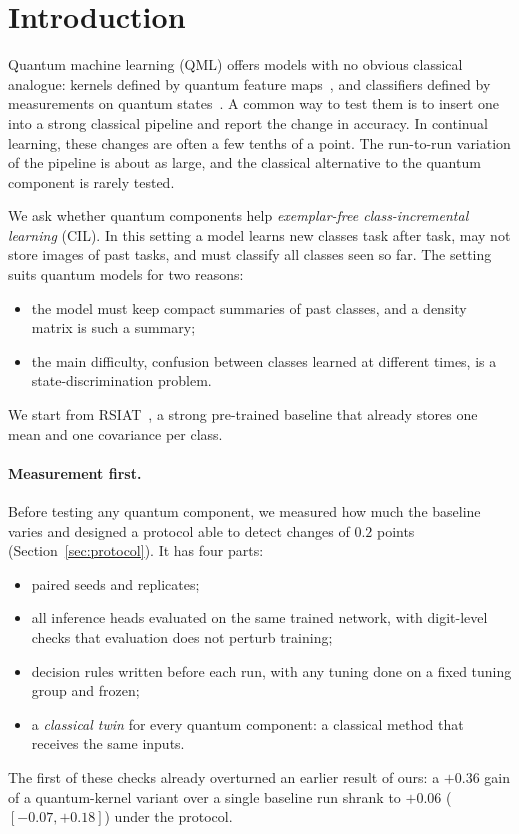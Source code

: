 \section{Introduction}
\label{sec:intro}

Quantum machine learning (QML) offers models with no obvious classical
analogue: kernels defined by quantum feature maps~\cite{huang2021power}, and
classifiers defined by measurements on quantum states~\cite{hausladen1994pgm}.
A common way to test them is to insert one into a strong classical pipeline
and report the change in accuracy. In continual learning, these changes are
often a few tenths of a point. The run-to-run variation of the pipeline is
about as large, and the classical alternative to the quantum component is
rarely tested.

We ask whether quantum components help \emph{exemplar-free
class-incremental learning} (CIL). In this setting a model learns new
classes task after task, may not store images of past tasks, and must
classify all classes seen so far. The setting suits quantum models for two
reasons:
\begin{itemize}
  \item the model must keep compact summaries of past classes, and a density
    matrix is such a summary;
  \item the main difficulty, confusion between classes learned at different
    times, is a state-discrimination problem.
\end{itemize}
We start from RSIAT~\cite{rsiat}, a strong pre-trained baseline that already
stores one mean and one covariance per class.

\paragraph{Measurement first.}
Before testing any quantum component, we measured how much the baseline
varies and designed a protocol able to detect changes of $0.2$ points
(Section~\ref{sec:protocol}). It has four parts:
\begin{itemize}
  \item paired seeds and replicates;
  \item all inference heads evaluated on the same trained network, with
    digit-level checks that evaluation does not perturb training;
  \item decision rules written before each run, with any tuning done on a
    fixed tuning group and frozen;
  \item a \emph{classical twin} for every quantum component: a classical
    method that receives the same inputs.
\end{itemize}
The first of these checks already overturned an earlier result of ours:
a $+0.36$ gain of a quantum-kernel variant over a single baseline run
shrank to $+0.06$ ($[-0.07,+0.18]$) under the protocol.

